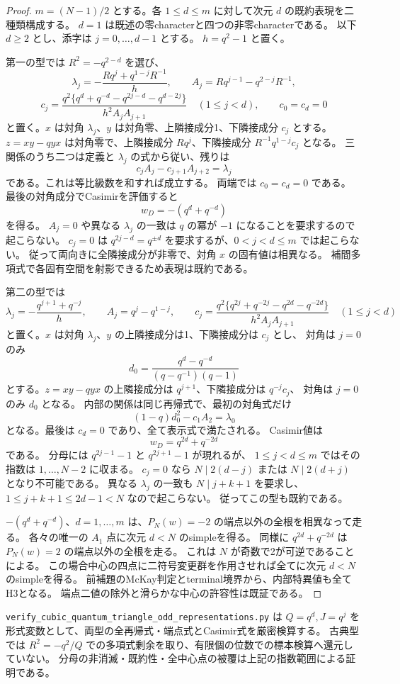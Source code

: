 \begin{proof}
$m=(N-1)/2$ とする。各 $1\le d\le m$ に対して次元 $d$ の既約表現を二種類構成する。
$d=1$ は既述の零characterと四つの非零characterである。
以下 $d\ge2$ とし、添字は $j=0,\ldots,d-1$ とする。
$h=q^2-1$ と置く。

第一の型では $R^2=-q^{2-d}$ を選び、
\[
 \lambda_j=-\frac{Rq^j+q^{1-j}R^{-1}}h,\qquad
 A_j=Rq^{j-1}-q^{2-j}R^{-1},
\]
\[
 c_j=\frac{q^2\{q^d+q^{-d}-q^{2j-d}-q^{d-2j}\}}
                  {h^2A_jA_{j+1}}\quad(1\le j<d),\qquad c_0=c_d=0
\]
と置く。$x$ は対角 $\lambda_j$、$y$ は対角零、上隣接成分1、下隣接成分 $c_j$ とする。
$z=xy-qyx$ は対角零で、上隣接成分 $Rq^j$、下隣接成分 $R^{-1}q^{1-j}c_j$ となる。
三関係のうち二つは定義と $\lambda_j$ の式から従い、残りは
\[
 c_jA_j-c_{j+1}A_{j+2}=\lambda_j
\]
である。これは等比級数を和すれば成立する。
両端では $c_0=c_d=0$ である。
最後の対角成分でCasimirを評価すると
\[
 w_D=-(q^d+q^{-d})
\]
を得る。
$A_j=0$ や異なる $\lambda_j$ の一致は $q$ の冪が $-1$ になることを要求するので起こらない。
$c_j=0$ は $q^{2j-d}=q^{\pm d}$ を要求するが、$0<j<d\le m$ では起こらない。
従って両向きに全隣接成分が非零で、対角 $x$ の固有値は相異なる。
補間多項式で各固有空間を射影できるため表現は既約である。

第二の型では
\[
 \lambda_j=-\frac{q^{j+1}+q^{-j}}h,\qquad
 A_j=q^j-q^{1-j},\qquad
 c_j=\frac{q^2\{q^{2j}+q^{-2j}-q^{2d}-q^{-2d}\}}
                  {h^2A_jA_{j+1}}\quad(1\le j<d)
\]
と置く。$x$ は対角 $\lambda_j$、$y$ の上隣接成分は1、下隣接成分は $c_j$ とし、
対角は $j=0$ のみ
\[
 d_0=\frac{q^d-q^{-d}}{(q-q^{-1})(q-1)}
\]
とする。$z=xy-qyx$ の上隣接成分は $q^{j+1}$、下隣接成分は $q^{-j}c_j$、
対角は $j=0$ のみ $d_0$ となる。
内部の関係は同じ再帰式で、最初の対角式だけ
\[
 (1-q)d_0^2-c_1A_2=\lambda_0
\]
となる。最後は $c_d=0$ であり、全て表示式で満たされる。
Casimir値は
\[
 w_D=q^{2d}+q^{-2d}
\]
である。
分母には $q^{2j-1}-1$ と $q^{2j+1}-1$ が現れるが、
$1\le j<d\le m$ ではその指数は $1,\ldots,N-2$ に収まる。
$c_j=0$ なら $N\mid2(d-j)$ または $N\mid2(d+j)$ となり不可能である。
異なる $\lambda_j$ の一致も $N\mid j+k+1$ を要求し、
$1\le j+k+1\le2d-1<N$ なので起こらない。
従ってこの型も既約である。

$-(q^d+q^{-d})$、$d=1,\ldots,m$ は、$P_N(w)=-2$ の端点以外の全根を相異なって走る。
各々の唯一の $A_1$ 点に次元 $d<N$ のsimpleを得る。
同様に $q^{2d}+q^{-2d}$ は $P_N(w)=2$ の端点以外の全根を走る。
これは $N$ が奇数で2が可逆であることによる。
この場合中心の四点に二符号変更群を作用させれば全てに次元 $d<N$ のsimpleを得る。
前補題のMcKay判定とterminal境界から、内部特異値も全てH3となる。
端点二値の除外と滑らかな中心の許容性は既証である。
\end{proof}

\texttt{verify\_\allowbreak cubic\_\allowbreak quantum\_\allowbreak triangle\_\allowbreak \allowbreak odd\_\allowbreak representations.py} は
$Q=q^d,J=q^j$ を形式変数として、両型の全再帰式・端点式とCasimir式を厳密検算する。
古典型では $R^2=-q^2/Q$ での多項式剰余を取り、有限個の位数での標本検算へ還元していない。
分母の非消滅・既約性・全中心点の被覆は上記の指数範囲による証明である。
